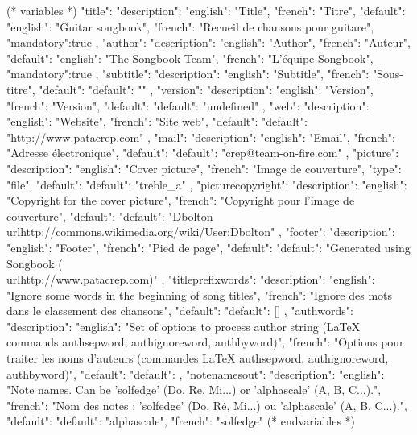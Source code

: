 (* variables *)
{
"title": {"description": {"english": "Title", "french": "Titre"},
            "default": {"english": "Guitar songbook", "french": "Recueil de chansons pour guitare"},
            "mandatory":true
         },
"author": {"description": {"english": "Author", "french": "Auteur"},
            "default": {"english": "The Songbook Team", "french": "L'équipe Songbook"},
            "mandatory":true
         },
"subtitle": {"description": {"english": "Subtitle", "french": "Sous-titre"},
            "default": {"default": ""}
            },
"version":{ "description": {"english": "Version", "french": "Version"},
            "default": {"default": "undefined"}
         },
"web": {"description": {"english": "Website", "french": "Site web"},
         "default": {"default": "http://www.patacrep.com"}
      },
"mail": {"description": {"english": "Email", "french": "Adresse électronique"},
         "default": {"default": "crep@team-on-fire.com"}
      },
"picture": {"description": {"english": "Cover picture", "french": "Image de couverture"},
            "type": "file",
            "default": {"default": "treble_a"}
         },
"picturecopyright": {"description": {"english": "Copyright for the cover picture", "french": "Copyright pour l'image de couverture"},
                     "default": {"default": "Dbolton \\url{http://commons.wikimedia.org/wiki/User:Dbolton}"}
                  },
"footer": {"description": {"english": "Footer", "french": "Pied de page"},
           "default": {"default": "Generated using Songbook (\\url{http://www.patacrep.com})"}
        },
"titleprefixwords": {"description": {"english": "Ignore some words in the beginning of song titles",
                                     "french": "Ignore des mots dans le classement des chansons"},
                     "default": {"default": []}
                     },
"authwords": {"description": {"english": "Set of options to process author string (LaTeX commands authsepword, authignoreword, authbyword)",
                              "french": "Options pour traiter les noms d'auteurs (commandes LaTeX authsepword, authignoreword, authbyword)"},
               "default": {"default": {}}
               },
"notenamesout": {"description": {"english": "Note names. Can be 'solfedge' (Do, Re, Mi...) or 'alphascale' (A, B, C...).",
                              "french": "Nom des notes : 'solfedge' (Do, Ré, Mi...) ou 'alphascale' (A, B, C...)."},
                  "default": {"default": "alphascale", "french": "solfedge"}
                  }
}
(* endvariables *)

